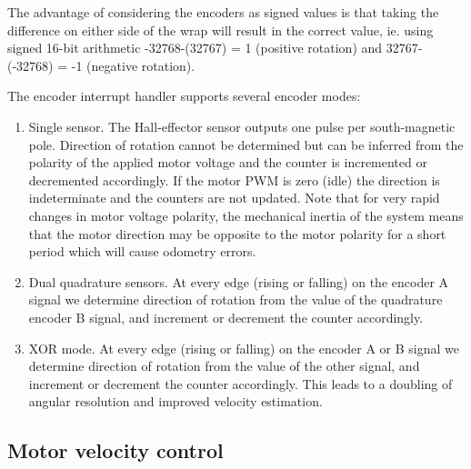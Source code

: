 \documentclass[11pt,fleqn]{article}
\begin{document}
The advantage of considering the encoders as signed values is that taking the difference on either side of the wrap will result in the correct value, ie. using signed 16-bit arithmetic -32768-(32767) = 1 (positive rotation) and 32767-(-32768) = -1 (negative rotation).

The encoder interrupt handler supports several encoder modes:
\begin{enumerate}[start=0]
\item Single sensor.
The Hall-effector sensor outputs one pulse per south-magnetic pole.  Direction of rotation cannot be determined but can be inferred from the polarity of the applied motor voltage and the counter is incremented or decremented accordingly.
If the motor PWM is zero (idle) the direction is indeterminate and the counters are not updated.
Note that for very rapid changes in motor voltage polarity, the mechanical inertia of the system means that the motor
direction may be opposite to the motor polarity for a short period which will cause odometry errors.

\item Dual quadrature sensors.
At every edge (rising or falling) on the encoder A signal we determine direction of rotation from the value of the quadrature encoder B signal, and increment or decrement the counter accordingly.

\item XOR mode.
At every edge (rising or falling) on the encoder A or B signal we determine direction of rotation from the value of the other signal, and
increment or decrement the counter accordingly.  This leads to a doubling of angular resolution and improved velocity estimation.
\end{enumerate}


\subsection{Motor velocity control}
\end{document}
